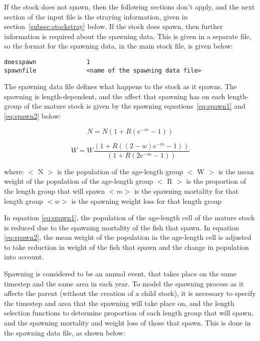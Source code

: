 \documentclass [a4paper, 10pt]{book}
\begin{document}
If the stock does not spawn, then the following sections don't apply, and the next section of the input file is the straying information, given in section~\ref{subsec:stockstray} below.  If the stock does spawn, then further information is required about the spawning data.  This is given in a separate file, so the format for the spawning data, in the main stock file, is given below:

{\small\begin{verbatim}
doesspawn              1
spawnfile              <name of the spawning data file>
\end{verbatim}}

The spawning data file defines what happens to the stock as it spawns.  The spawning is length-dependent, and the affect that spawning has on each length-group of the mature stock is given by the spawning equations~\ref{eq:spawn1} and \ref{eq:spawn2} below:

\begin{equation}\label{eq:spawn1}
N = N {\left(1 + R {(e^{-m} - 1)}\right)}
\end{equation}

\begin{equation}\label{eq:spawn2}
W = W \frac{\left(1 + R {((2 - w)e^{-m} - 1)}\right)}{\left(1 + R {(2e^{-m} - 1)}\right)}
\end{equation}

where:\newline
$<$ N $>$ is the population of the age-length group\newline
$<$ W $>$ is the mean weight of the population of the age-length group\newline
$<$ R $>$ is the proportion of the length group that will spawn\newline
$<m>$ is the spawning mortality for that length group\newline
$<w>$ is the spawning weight loss for that length group

\bigskip
In equation \ref{eq:spawn1}, the population of the age-length cell of the mature stock is reduced due to the spawning mortality of the fish that spawn.  In equation \ref{eq:spawn2}, the mean weight of the population in the age-length cell is adjusted to take reduction in weight of the fish that spawn and the change in population into account.

\bigskip
Spawning is considered to be an annual event, that takes place on the same timestep and the same area in each year.  To model the spawning process as it affects the parent (without the creation of a child stock), it is necessary to specify the timestep and area that the spawning will take place on, and the length selection functions to determine proportion of each length group that will spawn, and the spawning mortality and weight loss of those that spawn.  This is done in the spawning data file, as shown below:
\end{document}
